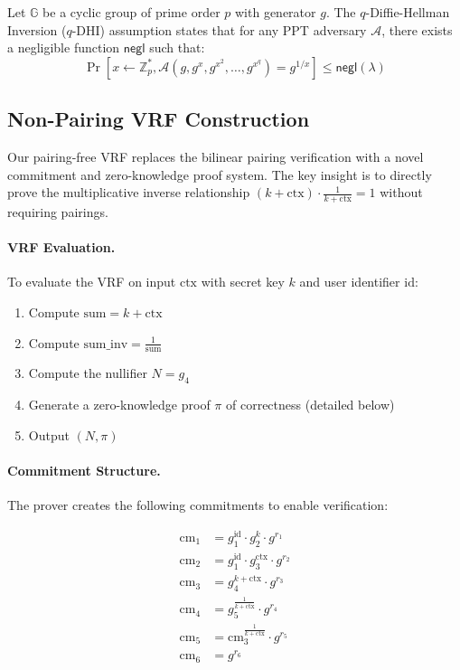 \begin{definition}
Let $\mathbb{G}$ be a cyclic group of prime order $p$ with generator $g$. The $q$-Diffie-Hellman Inversion ($q$-DHI) assumption states that for any PPT adversary $\mathcal{A}$, there exists a negligible function $\mathsf{negl}$ such that:
\[
\Pr\left[x \leftarrow \mathbb{Z}_p^*, \mathcal{A}(g, g^x, g^{x^2}, \ldots, g^{x^q}) = g^{1/x}\right] \leq \mathsf{negl}(\lambda)
\]
\end{definition}

\subsection{Non-Pairing VRF Construction}

Our pairing-free VRF replaces the bilinear pairing verification with a novel commitment and zero-knowledge proof system. The key insight is to directly prove the multiplicative inverse relationship $(k + \text{ctx}) \cdot \frac{1}{k+\text{ctx}} = 1$ without requiring pairings.

\paragraph{VRF Evaluation.} To evaluate the VRF on input $\text{ctx}$ with secret key $k$ and user identifier $\text{id}$:

\begin{enumerate}
    \item Compute $\text{sum} = k + \text{ctx}$
    \item Compute $\text{sum\_inv} = \frac{1}{\text{sum}}$
    \item Compute the nullifier $N = g_4$
    \item Generate a zero-knowledge proof $\pi$ of correctness (detailed below)
    \item Output $(N, \pi)$
\end{enumerate}

\paragraph{Commitment Structure.} The prover creates the following commitments to enable verification:

\begin{align}
\text{cm}_1 &= g_1^{\text{id}} \cdot g_2^{k} \cdot g^{r_1} \\
\text{cm}_2 &= g_1^{\text{id}} \cdot g_3^{\text{ctx}} \cdot g^{r_2} \\
\text{cm}_3 &= g_4^{k + \text{ctx}} \cdot g^{r_3} \\
\text{cm}_4 &= g_5^{\frac{1}{k + \text{ctx}}} \cdot g^{r_4} \\
\text{cm}_5 &= \text{cm}_3^{\frac{1}{k + \text{ctx}}} \cdot g^{r_5} \\
\text{cm}_6 &= g^{r_6}
\end{align}

